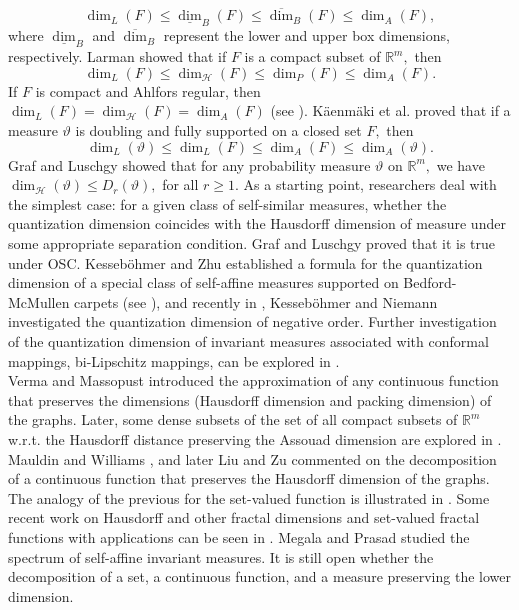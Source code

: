 \documentclass{amsproc}
\theoremstyle{definition}
\theoremstyle{remark}
\numberwithin{equation}{section}
\begin{document}
$$\dim_L(F)\le \underline{\dim}_B(F)\le\overline{\dim}_B(F)\le\dim_A (F),$$
where $\underline{\dim}_B$ and $\overline{\dim}_B$ represent the lower and upper box dimensions, respectively. Larman \cite{Larman} showed that if $F$ is a compact subset of $\mathbb{R}^m,$ then 
$$\dim_L(F)\le \dim_{\mathcal{H}}(F)\le\dim_P(F)\le\dim_A(F).$$
If $F$ is compact and Ahlfors regular, then $\dim_L(F)=\dim_\mathcal{H}(F)=\dim_A(F)$ (see \cite[Theorem 6.4.1]{Fraser}). 
K\"aenm\"aki et al. \cite{AJM} proved that if a measure $\vartheta$ is doubling and fully supported on a closed set $F,$ then 
$$\dim_L(\vartheta)\le\dim_L(F)\le\dim_A(F)\le\dim_A(\vartheta).$$
Graf and Luschgy \cite{GL1} showed that for any probability measure $\vartheta$ on $\mathbb{R}^m,$ we have $\dim_\mathcal{H}(\vartheta)\le D_r(\vartheta),$ for all $r\ge 1.$ As a starting point, researchers deal with the simplest case: for a given class of self-similar measures, whether the quantization dimension coincides with the Hausdorff dimension of measure under some appropriate separation condition. Graf and Luschgy \cite[Theorem 5.11]{GL3} proved that it is true under OSC. Kesseböhmer and Zhu \cite{KZ2} established a formula for the quantization dimension of a special class of self-affine measures supported on Bedford-McMullen carpets (see \cite{Fraser1}), and recently in \cite{K2}, Kesseböhmer and Niemann investigated the quantization dimension of negative order. Further investigation of the quantization dimension of invariant measures associated with conformal mappings, bi-Lipschitz mappings, can be explored in \cite{KPot, PVV1, Zhu1}.\\
Verma and Massopust \cite{VM1} introduced the approximation of any continuous function that preserves the dimensions (Hausdorff dimension and packing dimension) of the graphs. Later, some dense subsets of the set of all compact subsets of $\mathbb{R}^m$ w.r.t. the Hausdorff distance preserving the Assouad dimension are explored in \cite{VAM,VP1}. Mauldin and Williams \cite{Mauldin}, and later Liu and Zu \cite{Liu} commented on the decomposition of a continuous function that preserves the Hausdorff dimension of the graphs. The analogy of the previous for the set-valued function is illustrated in \cite{AV2}. Some recent work on Hausdorff and other fractal dimensions and set-valued fractal functions with applications can be seen in \cite{AV1,AV2,GP1, KBV11,KBV12,RSP,VAM,VP1}. Megala and Prasad \cite{MP1,MP2,MP3} studied the spectrum of self-affine invariant measures. It is still open whether the decomposition of a set, a continuous function, and a measure preserving the lower dimension.
\end{document}
